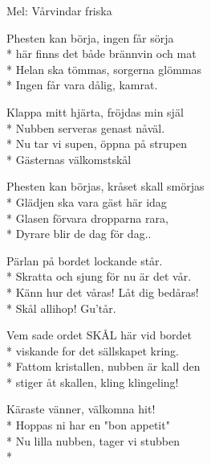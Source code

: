 \begin{SongText}
    \begin{SongInfo}
        Mel: Vårvindar friska
    \end{SongInfo}
    \begin{SongVerse}
        Phesten kan börja, ingen får sörja\\*%
        här finns det både brännvin och mat\\*%
        Helan ska tömmas, sorgerna glömmas\\*%
        Ingen får vara dålig, kamrat.
    \end{SongVerse}
    \begin{SongVerse}
        Klappa mitt hjärta, fröjdas min själ\\*%
        Nubben serveras genast nåväl.\\*%
        Nu tar vi supen, öppna på strupen\\*%
        Gästernas välkomstskål
    \end{SongVerse}
    \begin{SongVerse}
        Phesten kan börjas, kråset skall smörjas\\*%
        Glädjen ska vara gäst här idag\\*%
        Glasen förvara dropparna rara,\\*%
        Dyrare blir de dag för dag..
    \end{SongVerse}
    \begin{SongVerse}
        Pärlan på bordet lockande står.\\*%
        Skratta och sjung för nu är det vår.\\*%
        Känn hur det våras! Låt dig bedåras!\\*%
        Skål allihop! Gu’tår. 
    \end{SongVerse}
    \begin{SongVerse}
        Vem sade ordet SKÅL här vid bordet\\*%
        viskande for det sällskapet kring.\\*%
        Fattom kristallen, nubben är kall den\\*%
        stiger åt skallen, kling klingeling!
    \end{SongVerse}
    \begin{SongVerse}
        Käraste vänner, välkomna hit!\\*%
        Hoppas ni har en "bon appetit"\\*%
        Nu lilla nubben, tager vi stubben\\*%

\end{SongVerse}
\end{SongText}
